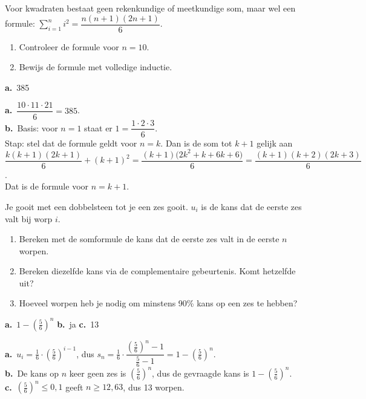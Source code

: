 \begin{oefeningen}
\begin{oefening}[3]\label{oef:h3-inductie}
 Voor kwadraten bestaat geen rekenkundige of meetkundige som, maar wel een formule: $\displaystyle\sum_{i=1}^{n} i^2 = \dfrac{n(n+1)(2n+1)}{6}$.
\begin{enumerate}
  \item Controleer de formule voor $n = 10$.
  \item Bewijs de formule met volledige inductie.
\end{enumerate}
\begin{solution}
\textbf{a.}~385
\end{solution}
\begin{fullsolution}
\textbf{a.}~$\dfrac{10\cdot 11\cdot 21}{6}=385$.\\
\textbf{b.}~Basis: voor $n=1$ staat er $1=\dfrac{1\cdot 2\cdot 3}{6}$.\\
Stap: stel dat de formule geldt voor $n=k$. Dan is de som tot $k+1$ gelijk aan\\
$\dfrac{k(k+1)(2k+1)}{6}+(k+1)^2=\dfrac{(k+1)\bigl(2k^2+k+6k+6\bigr)}{6}=\dfrac{(k+1)(k+2)(2k+3)}{6}$.\\
Dat is de formule voor $n=k+1$.
\end{fullsolution}
\end{oefening}

\begin{oefening}[2]
 Je gooit met een dobbelsteen tot je een zes gooit. $u_i$ is de kans dat de eerste zes valt bij worp $i$.
\begin{enumerate}
  \item Bereken met de somformule de kans dat de eerste zes valt in de eerste $n$ worpen.
  \item Bereken diezelfde kans via de complementaire gebeurtenis. Komt hetzelfde uit?
  \item Hoeveel worpen heb je nodig om minstens 90\% kans op een zes te hebben?
\end{enumerate}
\begin{solution}
\textbf{a.}~$1-(\tfrac56)^n$ \quad \textbf{b.}~ja \quad \textbf{c.}~13
\end{solution}
\begin{fullsolution}
\textbf{a.}~$u_i=\tfrac16\cdot(\tfrac56)^{i-1}$, dus $s_n=\tfrac16\cdot\dfrac{(\tfrac56)^n-1}{\tfrac56-1}=1-(\tfrac56)^n$.\\
\textbf{b.}~De kans op $n$ keer geen zes is $(\tfrac56)^n$, dus de gevraagde kans is $1-(\tfrac56)^n$.\\
\textbf{c.}~$(\tfrac56)^n\leqslant 0{,}1$ geeft $n\geqslant 12{,}63$, dus 13 worpen.
\end{fullsolution}
\end{oefening}


\end{oefeningen}
